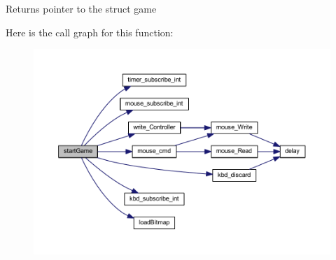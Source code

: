 \begin{DoxyReturn}{Returns}
pointer to the struct game 
\end{DoxyReturn}
Here is the call graph for this function\+:
\nopagebreak
\begin{figure}[H]
\begin{center}
\leavevmode
\includegraphics[width=350pt]{group___game_gadf0b0e23d862996b1c252ab29227ffb1_cgraph}
\end{center}
\end{figure}
